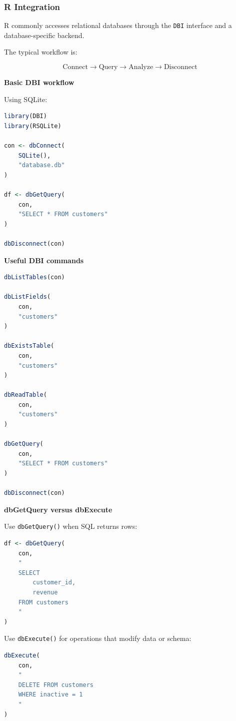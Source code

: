 \documentclass[11pt,letterpaper]{article}
\begin{document}

\subsubsection{R Integration}

R commonly accesses relational databases through the \texttt{DBI} interface
and a database-specific backend.

The typical workflow is:

\[
\text{Connect}
\rightarrow
\text{Query}
\rightarrow
\text{Analyze}
\rightarrow
\text{Disconnect}
\]

\textbf{Basic DBI workflow}

Using SQLite:

\begin{lstlisting}[language=R]
library(DBI)
library(RSQLite)

con <- dbConnect(
    SQLite(),
    "database.db"
)

df <- dbGetQuery(
    con,
    "SELECT * FROM customers"
)

dbDisconnect(con)
\end{lstlisting}

\textbf{Useful DBI commands}

\begin{lstlisting}[language=R]
dbListTables(con)

dbListFields(
    con,
    "customers"
)

dbExistsTable(
    con,
    "customers"
)

dbReadTable(
    con,
    "customers"
)

dbGetQuery(
    con,
    "SELECT * FROM customers"
)

dbDisconnect(con)
\end{lstlisting}

\textbf{dbGetQuery versus dbExecute}

Use \texttt{dbGetQuery()} when SQL returns rows:

\begin{lstlisting}[language=R]
df <- dbGetQuery(
    con,
    "
    SELECT
        customer_id,
        revenue
    FROM customers
    "
)
\end{lstlisting}

Use \texttt{dbExecute()} for operations that modify data or schema:

\begin{lstlisting}[language=R]
dbExecute(
    con,
    "
    DELETE FROM customers
    WHERE inactive = 1
    "
)
\end{lstlisting}
\end{document}
